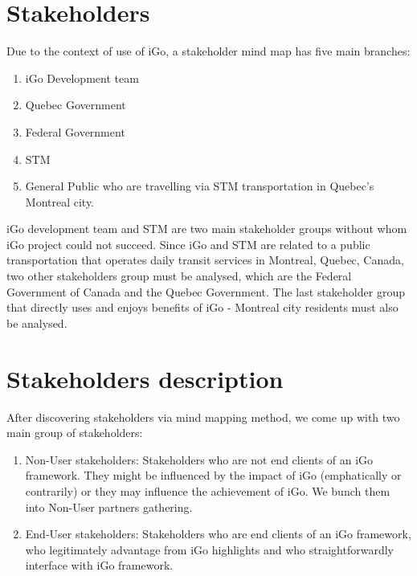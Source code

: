 \documentclass[11pt, english]{report}
\begin{document}

\section{Stakeholders}



  Due to the context of use of iGo, a stakeholder mind map has five main branches:
  \begin{enumerate}
      \item iGo Development team 
    \item Quebec Government
    \item Federal Government
    \item STM 
    \item General Public who are travelling via STM transportation in Quebec’s Montreal city. 

\end{enumerate}

iGo development team and STM are two main stakeholder groups without whom iGo project could not succeed. Since iGo and STM are related to a public transportation that operates daily transit services in Montreal, Quebec, Canada, two other stakeholders group must be analysed, which are the Federal Government of Canada and the Quebec Government. The last stakeholder group that directly uses and enjoys benefits of iGo - Montreal city residents must also be analysed. 

\section{Stakeholders description}
After discovering stakeholders via mind mapping method, we come up with two main group of stakeholders:
\begin{enumerate}
    \item Non-User stakeholders: Stakeholders who are not end clients of an iGo framework. They might be influenced by the impact of iGo (emphatically or contrarily) or they may influence the achievement of iGo. We bunch them into Non-User partners gathering.
    \item End-User stakeholders:
Stakeholders who are end clients of an iGo framework, who legitimately advantage from iGo highlights and who straightforwardly interface with iGo framework.

\end{enumerate}
\end{document}
